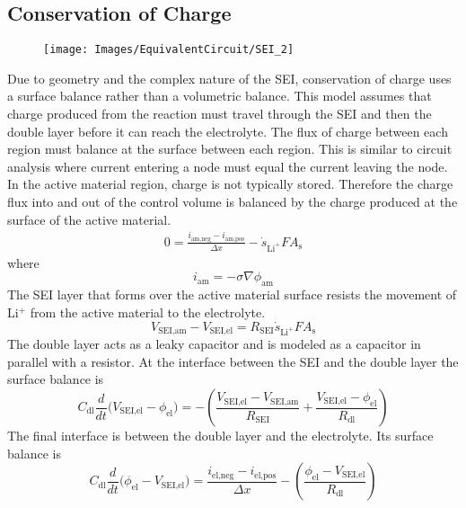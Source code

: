 \documentclass[12pt]{article}
\begin{document}
	\subsection{Conservation of Charge}
		\begin{figure} [h]
			\centering
			\texttt{[image: Images/EquivalentCircuit/SEI\_2]}
			\caption{}
			\label{fig:SEI}
		\end{figure}
		Due to geometry and the complex nature of the SEI, conservation of charge uses a surface balance rather than a volumetric balance. This model assumes that charge produced from the reaction must travel through the SEI and then the double layer before it can reach the electrolyte. The flux of charge between each region must balance at the surface between each region. This is similar to circuit analysis where current entering a node must equal the current leaving the node. \\
		In the active material region, charge is not typically stored.%
		Therefore the charge flux into and out of the control volume is balanced by the charge produced at the surface of the active material.
		\begin{gather}
			0 = \frac{i_\text{am,neg} - i_\text{am,pos}}{\Delta x} - \dot{s}_{\text{Li}^+}F A_\text{s}
		\end{gather}
		where
		\begin{equation}
			i_\text{am} = -\sigma \nabla \phi_{\text{am}}
		\end{equation}
		The SEI layer that forms over the active material surface resists the movement of Li$^+$ from the active material to the electrolyte.
		\begin{equation}
			V_\text{SEI,am} - V_\text{SEI,el} = R_\text{SEI} \dot{s}_{\text{Li}^+}F A_\text{s}
		\end{equation}
		The double layer acts as a leaky capacitor and is modeled as a capacitor in parallel with a resistor. At the interface between the SEI and the double layer the surface balance is
		\begin{equation}
			C_\text{dl}\frac{d }{dt}\Big(V_\text{SEI,el} - \phi_\text{el}\Big) = -\left(\frac{V_\text{SEI,el} - V_\text{SEI,am}}{R_\text{SEI}} + \frac{V_\text{SEI,el} - \phi_\text{el}}{R_\text{dl}} \right)
		\end{equation}
		The final interface is between the double layer and the electrolyte. Its surface balance is
		\begin{equation}
			C_\text{dl}\frac{d }{dt}\Big(\phi_\text{el} - V_\text{SEI,el}\Big) = \frac{i_\text{el,neg} - i_\text{el,pos}}{\Delta x} -\left(\frac{\phi_\text{el} - V_\text{SEI,el}}{R_\text{dl}} \right)
		\end{equation}
\end{document}
